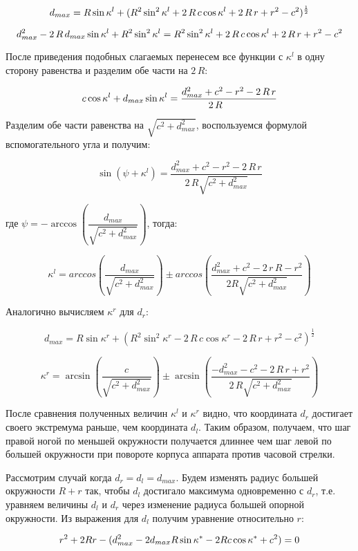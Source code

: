 $$
d_{max} = R\sin{\kappa^l}+(R^2\sin^2{\kappa^l}+2\,R\,c\cos{\kappa^l}+2\,R\,r+r^2-c^2)^{\frac{1}{2}}\\
$$

$$
d^2_{max}-2\,R\,d_{max}\sin{\kappa^l}+R^2\sin^2{\kappa^l} = R^2\sin^2{\kappa^l}+2\,R\,c\cos{\kappa^l}+2\,R\,r+r^2-c^2\\
$$

После приведения подобных слагаемых перенесем все функции с $\kappa^l$ в одну сторону равенства и разделим обе части на $2\,R$:

$$
c\cos{\kappa^l}+d_{max}\sin{\kappa^l} = \dfrac{d^2_{max}+c^2-r^2-2\,R\,r}{2\,R\\}
$$

Разделим обе части равенства на $\sqrt{c^2+d^2_{max}}$, воспользуемся формулой вспомогательного угла и получим:

$$
\sin{(\psi+\kappa^l)} = \dfrac{d^2_{max}+c^2-r^2-2\,R\,r}{2\,R\sqrt{c^2+d^2_{max}}}
$$

где $\psi = -\arccos{\left(\dfrac{d_{max}}{\sqrt{c^2+d^2_{max}}}\right)}$, тогда:

$$
\kappa^l = arccos\left(\dfrac{d_{max}}{\sqrt{c^2+d^2_{max}}}\right)\pm arccos\left(\dfrac{d^2_{max}+c^2-2\,r\,R-r^2}{2R\sqrt{c^2+d^2_{max}}}\right)
$$

Аналогично вычисляем $\kappa^{r}$ для $d_r$:

$$
d_{max} = R\sin{\kappa^r} + (R^2\sin^2{\kappa^r}-2\,R\,c\cos{\kappa^r}-2\,R\,r+r^2-c^2)^\frac{1}{2}
$$

$$
\kappa^r = \arcsin{\left(\dfrac{c}{\sqrt{c^2+d^2_{max}}}\right)}\pm\arcsin{\left(\dfrac{-d^2_{max}-c^2-2\,R\,r+r^2}{2\,R\sqrt{c^2+d^2_{max}}}\right)}
$$

После сравнения полученных величин $\kappa^l$ и $\kappa^{r}$ видно, что координата $d_r$ достигает своего экстремума раньше, чем координата $d_l$. Таким образом, получаем, что шаг правой ногой по меньшей окружности получается длиннее чем шаг левой по большей окружности при повороте корпуса аппарата против часовой стрелки.

Рассмотрим случай когда $d_r=d_l=d_{max}$. Будем изменять радиус большей окружности $R+r$ так, чтобы $d_l$ достигало максимума одновременно с $d_r$, т.е. уравняем величины $d_l$ и $d_r$ через изменение радиуса большей опорной окружности. Из выражения для $d_l$ получим уравнение относительно $r$:

\begin{equation}
r^2+2Rr-(d^2_{max}-2d_{max}R\sin\kappa^*-2Rc\cos{\kappa^*}+c^2)=0\\
\end{equation}

